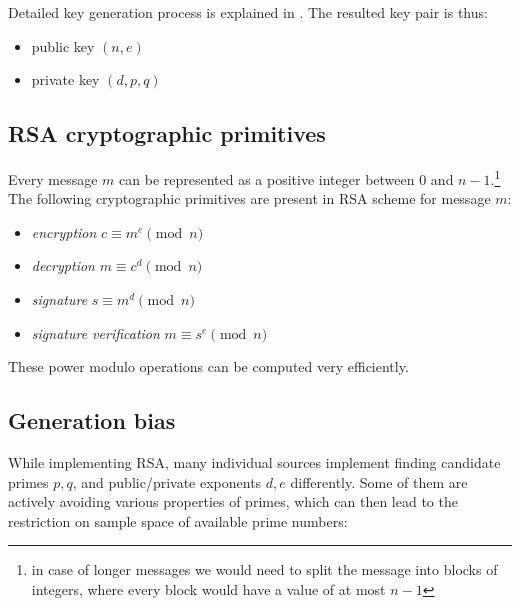 Detailed key generation process is explained in \cite{thesis_matus_nemec}. The resulted key pair is thus:

\begin{itemize}

\item public key $(n, e)$

\item private key $(d, p, q)$

\end{itemize}

\subsection*{RSA cryptographic primitives}

Every message $m$ can be represented as a positive integer between 0 and $n-1$.\footnote{in case of longer messages we would need to split the message into blocks of integers, where every block would have a value of at most $n-1$} The following cryptographic primitives are present in RSA scheme for message $m$:

\newpage

\begin{itemize}

\item \textit{encryption} $c \equiv m^e \pmod{n}$
\item \textit{decryption} $m \equiv c^d \pmod{n}$
\item \textit{signature} $s \equiv m^d \pmod{n}$
\item \textit{signature verification} $m \equiv s^e \pmod{n}$

\end{itemize}

\noindent
These power modulo operations can be computed very efficiently.

\subsection{Generation bias}

While implementing RSA, many individual sources implement finding candidate primes $p,q$, and public/private exponents $d,e$ differently. Some of them are actively avoiding various properties of primes, which can then lead to the restriction on sample space of available prime numbers:

